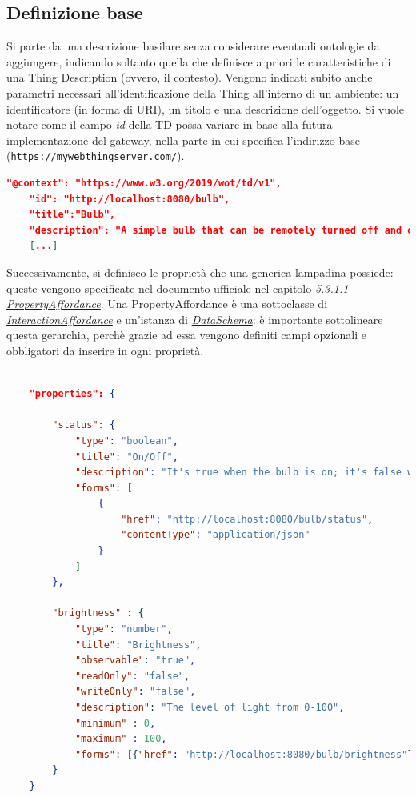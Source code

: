 \documentclass[12pt,a4paper,openright,oneside]{report}
\begin{document}
\subsection{Definizione base}
Si parte da una descrizione basilare senza considerare eventuali ontologie da aggiungere, indicando soltanto quella che definisce a priori le caratteristiche di una Thing Description (ovvero, il contesto). Vengono indicati subito anche parametri necessari all'identificazione della Thing all'interno di un ambiente: un identificatore (in forma di URI), un titolo e una descrizione dell'oggetto. Si vuole notare come il campo \textit{id} della TD possa variare in base alla futura implementazione del gateway, nella parte in cui specifica l'indirizzo base (\texttt{https://mywebthingserver.com/}).\\

\begin{lstlisting}[language=json,caption={Inizio di una TD della lampadina},label=lst:start-td-lamp]
	"@context": "https://www.w3.org/2019/wot/td/v1",
	"id": "http://localhost:8080/bulb",
	"title":"Bulb",
	"description": "A simple bulb that can be remotely turned off and on, with possibility to regulate its intensity.",
	[...]
\end{lstlisting}

Successivamente, si definisco le proprietà che una generica lampadina possiede: queste vengono specificate nel documento ufficiale nel capitolo \textit{\href{https://www.w3.org/TR/wot-thing-description/\#propertyaffordance}{5.3.1.1 - PropertyAffordance}}. Una PropertyAffordance è una sottoclasse di \textit{\href{https://www.w3.org/TR/wot-thing-description/\#interactionaffordance}{InteractionAffordance}} e un'istanza di \textit{\href{https://www.w3.org/TR/wot-thing-description/\#dataschema}{DataSchema}}: è importante sottolineare questa gerarchia, perchè grazie ad essa vengono definiti campi opzionali e obbligatori da inserire in ogni proprietà.

\clearpage
\begin{lstlisting}[language=json,caption={Proprietà di una lampadina},label=lst:start3-td-lamp]
	
	"properties": {
		
		"status": {
			"type": "boolean",
			"title": "On/Off",
			"description": "It's true when the bulb is on; it's false when turned off",
			"forms": [
				{
					"href": "http://localhost:8080/bulb/status",
					"contentType": "application/json"
				}
			]
		},
		
		"brightness" : {
			"type": "number",
			"title": "Brightness",
            "observable": "true",
            "readOnly": "false",
            "writeOnly": "false",
			"description": "The level of light from 0-100",
			"minimum" : 0,
			"maximum" : 100,
			"forms": [{"href": "http://localhost:8080/bulb/brightness"}]
		}
	}
\end{lstlisting}
\end{document}

